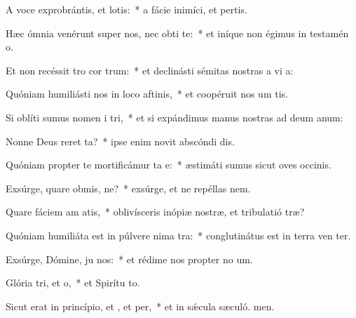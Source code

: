 \item A voce exprobrántis, et lotis:~* a fácie inimíci, et pertis.
\item Hæc ómnia venérunt super nos, nec obti  te:~* et iníque non égimus in testamén o.
\item Et non recéssit tro cor trum:~* et declinásti sémitas nostras a vi a:
\item Quóniam humiliásti nos in loco aftinis,~* et coopéruit nos um tis.
\item Si oblíti sumus nomen i tri,~* et si expándimus manus nostras ad deum anum:
\item Nonne Deus reret ta?~* ipse enim novit abscóndi dis.
\item Quóniam propter te mortificámur ta e:~* æstimáti sumus sicut oves occinis.
\item Exsúrge, quare obmis, ne?~* exsúrge, et ne repéllas  nem.
\item Quare fáciem am atis,~* oblivísceris inópiæ nostræ, et tribulatió træ?
\item Quóniam humiliáta est in púlvere nima tra:~* conglutinátus est in terra ven ter.
\item Exsúrge, Dómine, ju nos:~* et rédime nos propter no um.
\item Glória tri, et o,~* et Spirítu to.
\item Sicut erat in princípio, et , et per,~* et in sǽcula sæculó. men.
